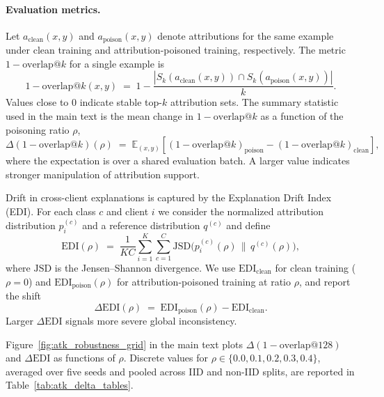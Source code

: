 \documentclass{article}
\theoremstyle{plain}
\theoremstyle{definition}
\theoremstyle{remark}
\begin{document}
\paragraph{Evaluation metrics.}
Let $a_{\text{clean}}(x,y)$ and $a_{\text{poison}}(x,y)$ denote attributions for the same example under clean training and attribution-poisoned training, respectively. The metric $1 - \text{overlap@}k$ for a single example is
\[
1 - \text{overlap@}k(x,y)
\;=\;
1 - \frac{|S_k(a_{\text{clean}}(x,y)) \cap S_k(a_{\text{poison}}(x,y))|}{k}.
\]
Values close to $0$ indicate stable top-$k$ attribution sets. The summary statistic used in the main text is the mean change in $1 - \text{overlap@}k$ as a function of the poisoning ratio $\rho$,
\[
\Delta(1 - \text{overlap@}k)(\rho)
\;=\;
\mathbb{E}_{(x,y)}\!
\left[
(1 - \text{overlap@}k)_{\text{poison}} 
- (1 - \text{overlap@}k)_{\text{clean}}
\right],
\]
where the expectation is over a shared evaluation batch. A larger value indicates stronger manipulation of attribution support.

Drift in cross-client explanations is captured by the Explanation Drift Index (EDI). For each class $c$ and client $i$ we consider the normalized attribution distribution $p_i^{(c)}$ and a reference distribution $q^{(c)}$ and define
\[
\mathrm{EDI}(\rho) \;=\; \frac{1}{KC}\sum_{i=1}^{K}\sum_{c=1}^{C}
\mathrm{JSD}\big(p_i^{(c)}(\rho) \,\|\, q^{(c)}(\rho)\big),
\]
where $\mathrm{JSD}$ is the Jensen--Shannon divergence. We use $\mathrm{EDI}_{\text{clean}}$ for clean training ($\rho=0$) and $\mathrm{EDI}_{\text{poison}}(\rho)$ for attribution-poisoned training at ratio $\rho$, and report the shift
\[
\Delta\mathrm{EDI}(\rho) \;=\; \mathrm{EDI}_{\text{poison}}(\rho) - \mathrm{EDI}_{\text{clean}}.
\]
Larger $\Delta\mathrm{EDI}$ signals more severe global inconsistency.

Figure~\ref{fig:atk_robustness_grid} in the main text plots $\Delta(1-\text{overlap@}128)$ and $\Delta\mathrm{EDI}$ as functions of $\rho$. Discrete values for $\rho\in\{0.0,0.1,0.2,0.3,0.4\}$, averaged over five seeds and pooled across IID and non-IID splits, are reported in Table~\ref{tab:atk_delta_tables}.
\end{document}
